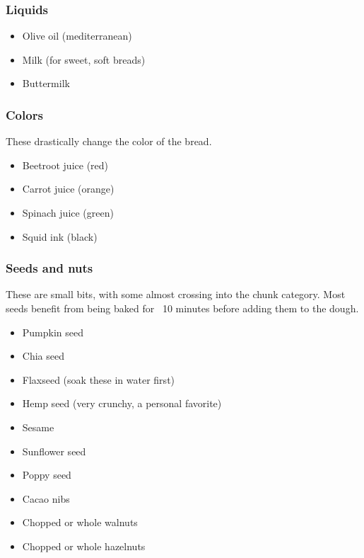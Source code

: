 \subsubsection{Liquids}
\begin{itemize}
  \item Olive oil (mediterranean)
  \item Milk (for sweet, soft breads)
  \item Buttermilk
\end{itemize}

\subsubsection{Colors}
These drastically change the color of the bread.
\begin{itemize}
  \item Beetroot juice (red)
  \item Carrot juice (orange)
  \item Spinach juice (green)
  \item Squid ink (black)
\end{itemize}

\subsubsection{Seeds and nuts}
These are small bits, with some almost crossing into the chunk category. Most seeds benefit from being baked for ~10 minutes before adding them to the dough.
\begin{itemize}
  \item Pumpkin seed
  \item Chia seed
  \item Flaxseed  (soak these in water first)
  \item Hemp seed (very crunchy, a personal favorite)
  \item Sesame
  \item Sunflower seed
  \item Poppy seed
  \item Cacao nibs
  \item Chopped or whole walnuts
  \item Chopped or whole hazelnuts
\end{itemize}

